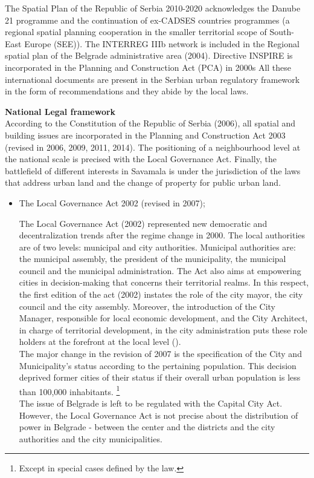 \documentclass[11pt]{report}
\begin{document}
{{{{The Spatial Plan of the Republic of Serbia 2010-2020 acknowledges the Danube 21 programme and the continuation of ex-CADSES countries programmes (a regional spatial planning cooperation in the smaller territorial scope of South-East Europe (SEE)). The INTERREG IIIb network is included in the Regional spatial plan of the Belgrade administrative area (2004). Directive INSPIRE is incorporated in the Planning and Construction Act (PCA) in 2000s All these international documents are present in the Serbian urban regulatory framework in the form of recommendations and they abide by the local laws. 

\textbf{National Legal framework}
\\
According to the Constitution of the Republic of Serbia (2006), all spatial and building issues are incorporated in the Planning and Construction Act 2003 (revised in 2006, 2009, 2011, 2014). The positioning of a neighbourhood level at the national scale is precised with the Local Governance Act.
Finally, the battlefield of different interests in Savamala is under the jurisdiction of the laws that address urban land and the change of property for public urban land.

\begin{itemize}
\item The Local Governance Act 2002 (revised in 2007);

The Local Governance Act (2002) represented new democratic and decentralization trends after the regime change in 2000. The local authorities are of two levels: municipal and city authorities. Municipal authorities are: the municipal assembly, the president of the municipality, the municipal council and the municipal administration. The Act also aims at empowering cities in decision-making that concerns their territorial realms. In this respect, the first edition of the act (2002) instates the role of the city mayor, the city council and the city assembly. Moreover, the introduction of the City Manager, responsible for local economic development, and the City Architect, in charge of territorial development, in the city administration puts these role holders at the forefront at the local level (\href{Vujovic}{\citealt{vujovic_belgrades_2007}}).
\\

The major change in the revision of 2007 is the specification of the City and Municipality’s status according to the pertaining population. This decision deprived former cities of their status if their overall urban population is less than 100,000 inhabitants.
\footnote{Except in special cases defined by the law.}
\\
The issue of Belgrade is left to be regulated with the Capital City Act.
However, the Local Governance Act is not precise about the distribution of power in Belgrade - between the center and the districts and the city authorities and the city municipalities.


\end{itemize}}}}}
\end{document}
